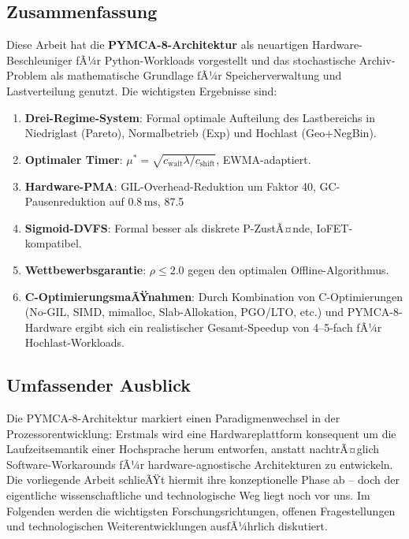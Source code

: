 ﻿\documentclass[a4paper,12pt]{scrreprt}
\theoremstyle{definition}
\begin{document}
	\subsection{Zusammenfassung}
	
	Diese Arbeit hat die \textbf{PYMCA-8-Architektur} als neuartigen Hardware-Beschleuniger fÃ¼r Python-Workloads vorgestellt und das stochastische Archiv-Problem als mathematische Grundlage fÃ¼r Speicherverwaltung und Lastverteilung genutzt. Die wichtigsten Ergebnisse sind:

	\begin{enumerate}[noitemsep]
		\item \textbf{Drei-Regime-System}: Formal optimale Aufteilung des Lastbereichs in Niedriglast (Pareto), Normalbetrieb (Exp) und Hochlast (Geo+NegBin).
		\item \textbf{Optimaler Timer}: $\mu^* = \sqrt{c_{\mathrm{wait}} \lambda / c_{\mathrm{shift}}}$, EWMA-adaptiert.
		\item \textbf{Hardware-PMA}: GIL-Overhead-Reduktion um Faktor 40, GC-Pausenreduktion auf $0.8\,\mathrm{ms}$, 87.5\,%
		\item \textbf{Sigmoid-DVFS}: Formal besser als diskrete P-ZustÃ¤nde, IoFET-kompatibel.
		\item \textbf{Wettbewerbsgarantie}: $\rho \le 2.0$ gegen den optimalen Offline-Algorithmus.
		\item \textbf{C-OptimierungsmaÃŸnahmen}: Durch Kombination von C-Optimierungen (No-GIL, SIMD, mimalloc, Slab-Allokation, PGO/LTO, etc.) und PYMCA-8-Hardware ergibt sich ein realistischer Gesamt-Speedup von 4--5-fach fÃ¼r Hochlast-Workloads.
	\end{enumerate}

	\subsection{Umfassender Ausblick}

	Die PYMCA-8-Architektur markiert einen Paradigmenwechsel in der Prozessorentwicklung:
	Erstmals wird eine Hardwareplattform konsequent um die Laufzeitsemantik einer
	Hochsprache herum entworfen, anstatt nachtrÃ¤glich Software-Workarounds fÃ¼r
	hardware-agnostische Architekturen zu entwickeln. Die vorliegende Arbeit schlieÃŸt
	hiermit ihre konzeptionelle Phase ab -- doch der eigentliche wissenschaftliche
	und technologische Weg liegt noch vor uns. Im Folgenden werden die wichtigsten
	Forschungsrichtungen, offenen Fragestellungen und technologischen Weiterentwicklungen
	ausfÃ¼hrlich diskutiert.
\end{document}
